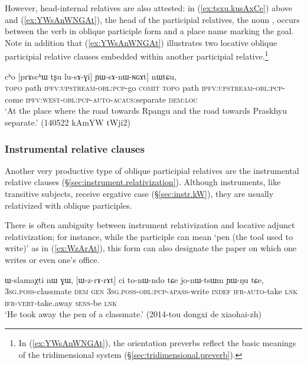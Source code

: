 However, head-internal relatives are also attested: in (\ref{ex:tsxu.kusAxCe}) above and (\ref{ex:YWsAnWNGAt}), the head of the participial relatives, the noun , occurs between the verb in oblique participle form and a place name marking the goal. Note in addition that (\ref{ex:YWsAnWNGAt}) illustrates two locative oblique participial relative clauses embedded within another participial relative.\footnote{In (\ref{ex:YWsAnWNGAt}), the orientation preverbs reflect the basic meanings of the tridimensional system (§\ref{sec:tridimensional.preverb}). 
}

\begin{exe}
\ex \label{ex:YWsAnWNGAt}
\gll   [[rpɤŋgɯ tʂu lu-sɤx-ɕe] cʰo [prɤscʰɯ tʂu lu-sɤ-ɣi] ɲɯ-sɤ-nɯ-ɴɢɤt] nɯtɕu, \\
\textsc{topo}  path \textsc{ipfv}:\textsc{upstream}-\textsc{obl}:\textsc{pcp}-go \textsc{comit}  \textsc{topo}  path \textsc{ipfv}:\textsc{upstream}-\textsc{obl}:\textsc{pcp}-come \textsc{ipfv}:\textsc{west}-\textsc{obl}:\textsc{pcp}-\textsc{auto}-\textsc{acaus}:separate \textsc{dem}:\textsc{loc} \\
\glt `At the place where the road towards Rpangu and the road towards Praskhyu separate.' (140522 kAmYW tWji2)
\end{exe}

\subsubsection{Instrumental relative clauses} \label{sec:instrumental.participle.relatives}
Another very productive type of oblique participial relatives are the instrumental relative clauses (§\ref{sec:instrument.relativization}). Although instruments, like transitive subjects, receive ergative case (§\ref{sec:instr.kW}), they are usually relativized with oblique participles.

There is often ambiguity between instrument relativization and locative adjunct relativization; for instance, while the participle  can mean `pen (the tool used to write)' as in (\ref{ex:WzArAt}), this form can also designate the paper on which one writes or even one's office.

\begin{exe}
\ex \label{ex:WzArAt}
\gll ɯ-slamaχti nɯ ɣɯ, [ɯ-z-rɤ-rɤt] ci to-nɯ-ndo tɕe jo-nɯ-tsɯm ɲɯ-ŋu tɕe, \\
\textsc{3sg}.\textsc{poss}-classmate \textsc{dem} \textsc{gen} \textsc{3sg}.\textsc{poss}-\textsc{obl}:\textsc{pcp}-\textsc{apass}-write \textsc{indef} \textsc{ifr}-\textsc{auto}-take \textsc{lnk} \textsc{ifr}-\textsc{vert}-take.away \textsc{sens}-be \textsc{lnk} \\
\glt `He took away the pen of a classmate.' (2014-tou dongxi de xiaohai-zh)
\end{exe}

